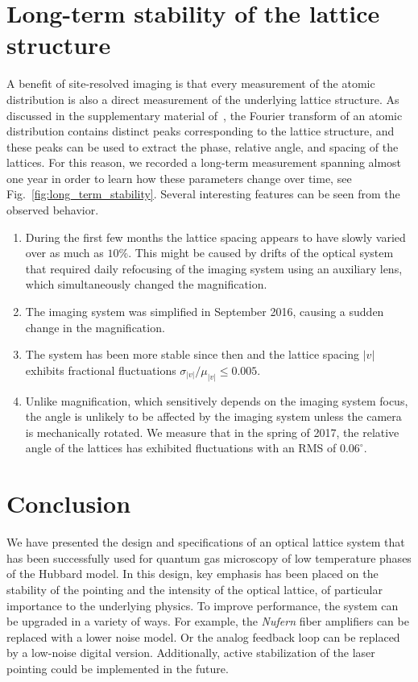 \documentclass[twocolumn,aps,pra,showpacs,preprintnumbers,bibnotes]{revtex4-1}
\begin{document}
\section{Long-term stability of the lattice structure}
A benefit of site-resolved imaging is that every measurement of the atomic distribution is also a direct measurement of the underlying lattice structure. 
As discussed in the supplementary material of~\cite{Parsons2016, Greif2016}, the Fourier transform of an atomic distribution contains distinct peaks corresponding to the lattice structure, and these peaks can be used to extract the phase, relative angle, and spacing of the lattices.
For this reason, we recorded a long-term measurement spanning almost one year in order to learn how these parameters change over time, see Fig.~\ref{fig:long_term_stability}.
Several interesting features can be seen from the observed behavior.
\begin{enumerate}
  \item During the first few months the lattice spacing appears to have slowly varied over as much as $10\%$.
    This might be caused by drifts of the optical system that required daily refocusing of the imaging system using an auxiliary lens, which simultaneously changed the magnification. 
  \item The imaging system was simplified in September 2016, causing a sudden change in the magnification. 
  \item The system has been more stable since then and the lattice spacing $|v|$ exhibits fractional fluctuations $\sigma_{|v|}/\mu_{|v|}\leq 0.005$.
  \item Unlike magnification, which sensitively depends on the imaging system focus, the angle is unlikely to be affected by the imaging system unless the camera is mechanically rotated. We measure that in the spring of 2017, the relative angle of the lattices has exhibited fluctuations with an RMS of $0.06^\circ$.
\end{enumerate}



\section{Conclusion}
We have presented the design and specifications of an optical lattice system that has been successfully used for quantum gas microscopy of low temperature phases of the Hubbard model.
In this design, key emphasis has been placed on the stability of the pointing and the intensity of the optical lattice, of particular importance to the underlying physics.
To improve performance, the system can be upgraded in a variety of ways. For example, the \textit{Nufern} fiber amplifiers can be replaced with a lower noise model. Or the analog feedback loop can be replaced by a low-noise digital version. Additionally, active stabilization of the laser pointing could be implemented in the future.


\end{document}
